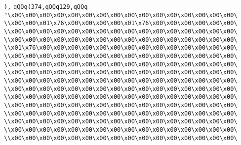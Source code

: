 \verb|),|\newline
\verb|qQQq(374,qQQq129,qQQq|\newline
\verb|"\x00\x00\x00\x00\x00\x00\x00\x00\x00\x00\x00\x00\x00\x00\x00\x00\|\newline
\verb|\\x00\x00\x01\x76\x00\x00\x00\x00\x01\x76\x00\x00\x00\x00\x00\x00\|\newline
\verb|\\x00\x00\x00\x00\x00\x00\x00\x00\x00\x00\x00\x00\x00\x00\x00\x00\|\newline
\verb|\\x00\x00\x00\x00\x00\x00\x00\x00\x00\x00\x00\x00\x00\x00\x00\x00\|\newline
\verb|\\x01\x76\x00\x00\x00\x00\x00\x00\x00\x00\x00\x00\x00\x00\x00\x00\|\newline
\verb|\\x00\x00\x00\x00\x00\x00\x00\x00\x00\x00\x00\x00\x00\x00\x00\x00\|\newline
\verb|\\x00\x00\x00\x00\x00\x00\x00\x00\x00\x00\x00\x00\x00\x00\x00\x00\|\newline
\verb|\\x00\x00\x00\x00\x00\x00\x00\x00\x00\x00\x00\x00\x00\x00\x00\x00\|\newline
\verb|\\x00\x00\x00\x00\x00\x00\x00\x00\x00\x00\x00\x00\x00\x00\x00\x00\|\newline
\verb|\\x00\x00\x00\x00\x00\x00\x00\x00\x00\x00\x00\x00\x00\x00\x00\x00\|\newline
\verb|\\x00\x00\x00\x00\x00\x00\x00\x00\x00\x00\x00\x00\x00\x00\x00\x00\|\newline
\verb|\\x00\x00\x00\x00\x00\x00\x00\x00\x00\x00\x00\x00\x00\x00\x00\x00\|\newline
\verb|\\x00\x00\x00\x00\x00\x00\x00\x00\x00\x00\x00\x00\x00\x00\x00\x00\|\newline
\verb|\\x00\x00\x00\x00\x00\x00\x00\x00\x00\x00\x00\x00\x00\x00\x00\x00\|\newline
\verb|\\x00\x00\x00\x00\x00\x00\x00\x00\x00\x00\x00\x00\x00\x00\x00\x00\|\newline
\verb|\\x00\x00\x00\x00\x00\x00\x00\x00\x00\x00\x00\x00\x00\x00\x00\x00\|\newline
